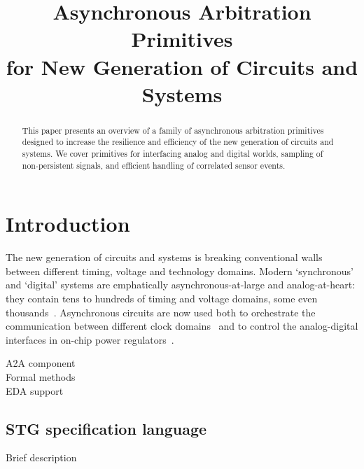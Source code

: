\documentclass[conference]{IEEEtran}
\begin{document}
\title{Asynchronous Arbitration Primitives\\for New Generation of Circuits and Systems}

\author{
}

\maketitle

\begin{abstract}
This paper presents an overview of a family of asynchronous arbitration
primitives designed to increase the resilience and efficiency of
the new generation of circuits and systems. We cover primitives for
interfacing analog and digital worlds, sampling of non-persistent
signals, and efficient handling of correlated sensor events.
\end{abstract}


\section{Introduction}

The new generation of circuits and systems is breaking conventional walls between
different timing, voltage and technology domains. Modern `synchronous' and `digital'
systems are emphatically asynchronous-at-large and analog-at-heart: they contain tens
to hundreds of timing and voltage domains, some even thousands~\cite{2017_bohnenstiehl_kilocore}.
Asynchronous circuits are now used both to orchestrate the communication between different clock
domains~\cite{2017_jiang_noc} and to control the analog-digital interfaces in on-chip power
regulators~\cite{2017_sokolov_a4a}.

A2A component\\
Formal methods\\
EDA support\\

\subsection{STG specification language}

Brief description\\
\end{document}
